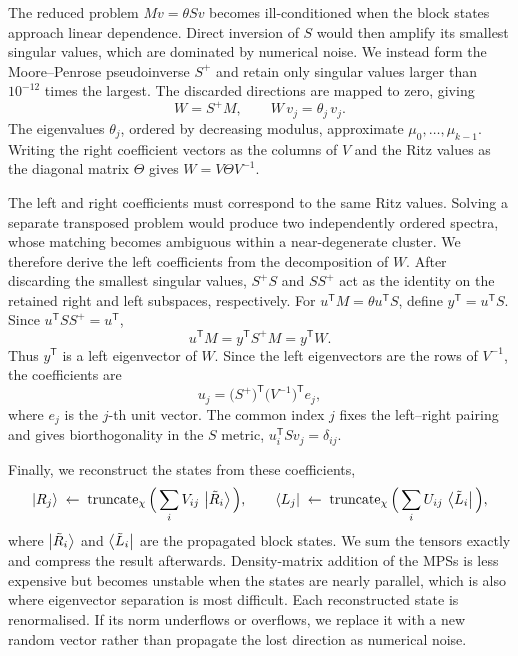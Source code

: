 The reduced problem $Mv=\theta Sv$ becomes ill-conditioned when the block states approach linear dependence. Direct inversion of $S$ would then amplify its smallest singular values, which are dominated by numerical noise. We instead form the Moore--Penrose pseudoinverse $S^{+}$ and retain only singular values larger than $10^{-12}$ times the largest. The discarded directions are mapped to zero, giving
\begin{equation}
  W = S^{+}M, \qquad W\,v_j = \theta_j\,v_j .
  \label{eq:app:blockpm:W}
\end{equation}
The eigenvalues $\theta_j$, ordered by decreasing modulus, approximate $\mu_0,\dots,\mu_{k-1}$. Writing the right coefficient vectors as the columns of $V$ and the Ritz values as the diagonal matrix $\Theta$ gives $W=V\Theta V^{-1}$.

The left and right coefficients must correspond to the same Ritz values. Solving a separate transposed problem would produce two independently ordered spectra, whose matching becomes ambiguous within a near-degenerate cluster. We therefore derive the left coefficients from the decomposition of $W$. After discarding the smallest singular values, $S^{+}S$ and $SS^{+}$ act as the identity on the retained right and left subspaces, respectively. For $u^{\mathsf T}M=\theta u^{\mathsf T}S$, define $y^{\mathsf T}=u^{\mathsf T}S$. Since $u^{\mathsf T}SS^{+}=u^{\mathsf T}$,
\begin{equation}
  u^{\mathsf T}M
  =y^{\mathsf T}S^{+}M
  =y^{\mathsf T}W.
\end{equation}
Thus $y^{\mathsf T}$ is a left eigenvector of $W$. Since the left eigenvectors are the rows of $V^{-1}$, the coefficients are
\begin{equation}
  u_j = \big(S^{+}\big)^{\mathsf T}\big(V^{-1}\big)^{\mathsf T} e_j ,
  \label{eq:app:blockpm:left}
\end{equation}
where $e_j$ is the $j$-th unit vector. The common index $j$ fixes the left--right pairing and gives biorthogonality in the $S$ metric, $u_i^{\mathsf T}Sv_j=\delta_{ij}$.

Finally, we reconstruct the states from these coefficients,
\begin{equation}
  \ket{R_j} \;\gets\; \operatorname{truncate}_\chi\Big(\sum_i V_{ij}\,\ket{\tilde R_i}\Big),
  \qquad
  \bra{L_j} \;\gets\; \operatorname{truncate}_\chi\Big(\sum_i U_{ij}\,\bra{\tilde L_i}\Big),
  \label{eq:app:blockpm:recon}
\end{equation}
where $\ket{\tilde R_i}$ and $\bra{\tilde L_i}$ are the propagated block states. We sum the tensors exactly and compress the result afterwards. Density-matrix addition of the \acp{MPS} is less expensive but becomes unstable when the states are nearly parallel, which is also where eigenvector separation is most difficult. Each reconstructed state is renormalised. If its norm underflows or overflows, we replace it with a new random vector rather than propagate the lost direction as numerical noise.

